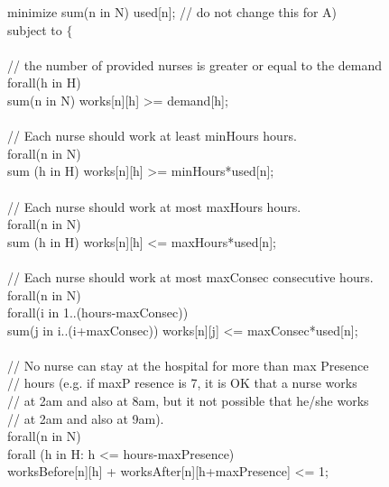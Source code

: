 \documentclass[11pt]{article}
\begin{document}
{\begin{appendix}
{minimize sum(n in N) used[n]; // do not change this for A)\\
subject to $\{$\\\\
// the number of provided nurses is greater or equal to the demand\\
forall(h in H)\\
sum(n in N) works[n][h] >= demand[h]; \\
\\
// Each nurse should work at least minHours hours.\\
forall(n in N)\\
sum (h in H) works[n][h] >= minHours*used[n];\\
\\
// Each nurse should work at most maxHours hours.\\
forall(n in N)\\
sum (h in H) works[n][h] <= maxHours*used[n];\\
\\
// Each nurse should work at most maxConsec consecutive hours.\\
forall(n in N)\\
forall(i in 1..(hours-maxConsec))\\
sum(j in i..(i+maxConsec)) works[n][j] <= maxConsec*used[n];\\
\\
// No nurse can stay at the hospital for more than max Presence \\
// hours (e.g. if maxP resence is 7, it is OK that a nurse works \\
// at 2am and also at 8am, but it not possible that he/she works \\
// at 2am and also at 9am).\\
forall(n in N)\\
forall (h in H: h <= hours-maxPresence)\\
worksBefore[n][h] + worksAfter[n][h+maxPresence] <= 1;\\

}
\end{appendix}}
\end{document}
